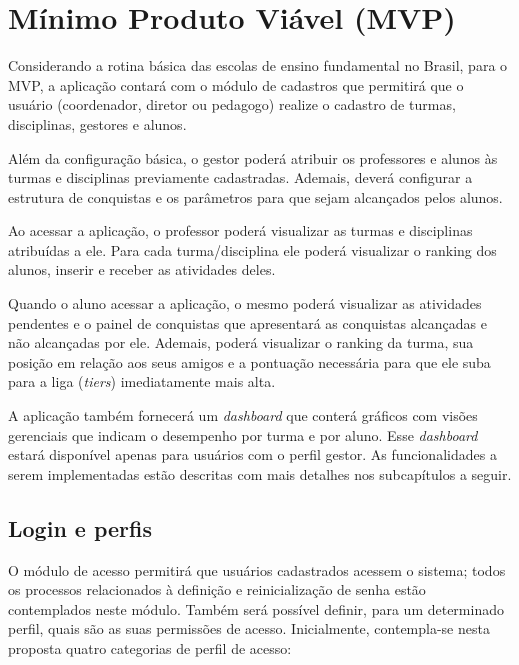 \documentclass[
    12pt,               %
    openright,          %
    oneside,
    a4paper,            %
    paginasA3,  %
    english,            %
    brazil              %
    ]{ifsp-spo-inf-ctds} %
\begin{document}
\section{Mínimo Produto Viável (MVP)}
Considerando a rotina básica das escolas de ensino fundamental no Brasil, para o MVP, a aplicação contará com o módulo de cadastros que permitirá que o usuário (coordenador, diretor ou pedagogo) realize o cadastro de turmas, disciplinas, gestores e alunos.


Além da configuração básica, o gestor poderá atribuir os professores e alunos às turmas e disciplinas previamente cadastradas. Ademais, deverá configurar a estrutura de conquistas e os parâmetros para que sejam alcançados pelos alunos.


Ao acessar a aplicação, o professor poderá visualizar as turmas e disciplinas atribuídas a ele. Para cada turma/disciplina ele poderá visualizar o ranking dos alunos, inserir e receber as atividades deles.


Quando o aluno acessar a aplicação, o mesmo poderá visualizar as atividades pendentes e o painel de conquistas que apresentará as conquistas alcançadas e não alcançadas por ele. Ademais, poderá visualizar o ranking da turma, sua posição em relação aos seus amigos e a pontuação necessária para que ele suba para a liga (\textit{\glspl{tier}}) imediatamente mais alta.


A aplicação também fornecerá um \textit{\gls{dashboard}} que conterá gráficos com visões gerenciais que indicam o desempenho por turma e por aluno. Esse \textit{\gls{dashboard}} estará disponível apenas para  usuários com o perfil gestor.
As funcionalidades a serem implementadas estão descritas com mais detalhes nos subcapítulos a seguir. 


\subsection{Login e perfis}
O módulo de acesso permitirá que usuários cadastrados acessem o sistema; todos os processos relacionados à definição e reinicialização de senha estão contemplados neste módulo. Também será possível definir, para um determinado perfil, quais são as suas permissões de acesso.
Inicialmente, contempla-se nesta proposta quatro categorias de perfil de acesso: 
\end{document}
